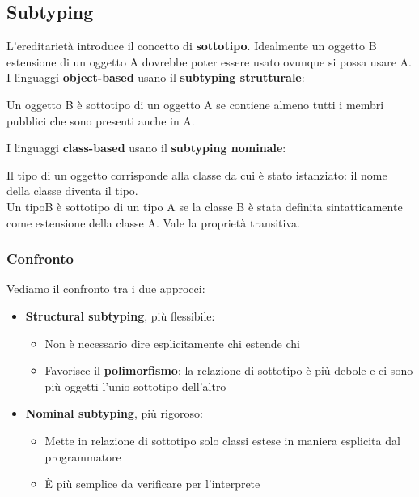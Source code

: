 \subsection{Subtyping}
L'ereditarietà introduce il concetto di \textbf{sottotipo}. Idealmente un oggetto B estensione di un oggetto A dovrebbe poter essere usato ovunque si possa usare A.\\
I linguaggi \textbf{object-based} usano il \textbf{subtyping strutturale}:
\begin{definition}
	Un oggetto B è sottotipo di un oggetto A se contiene almeno tutti i membri pubblici che sono presenti anche in A.
\end{definition}
I linguaggi \textbf{class-based} usano il \textbf{subtyping nominale}:
\begin{definition}
	Il tipo di un oggetto corrisponde alla classe da cui è stato istanziato: il nome della classe diventa il tipo.\\
	Un tipoB è sottotipo di un tipo A se la classe B è stata definita sintatticamente come estensione della classe A. Vale la proprietà transitiva.
\end{definition}
\subsubsection{Confronto}
Vediamo il confronto tra i due approcci:
\begin{itemize}
	\item \textbf{Structural subtyping}, più flessibile:
	\begin{itemize}
		\item Non è necessario dire esplicitamente chi estende chi
		\item Favorisce il \textbf{polimorfismo}: la relazione di sottotipo è più debole e ci sono più oggetti l'unio sottotipo dell'altro
	\end{itemize}
	\item \textbf{Nominal subtyping}, più rigoroso:
	\begin{itemize}
		\item Mette in relazione di sottotipo solo classi estese in maniera esplicita dal programmatore
		\item È più semplice da verificare per l'interprete
	\end{itemize}
\end{itemize}

